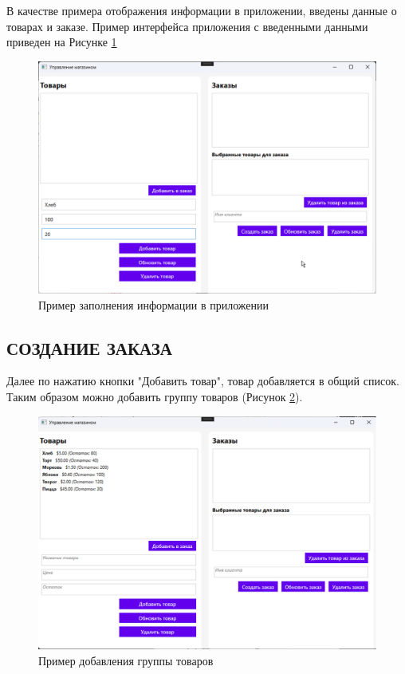 \documentclass[12pt]{article}
\begin{document}
В качестве примера отображения информации в приложении, введены данные о товарах и заказе. Пример интерфейса приложения с введенными данными приведен на Рисунке \ref{fig:demo2}

\begin{figure}[ht]
	\centering
	\includegraphics[width=1.0\textwidth]{fig/image 27.png}
	\caption{Пример заполнения информации в приложении}
	\label{fig:demo2}
\end{figure}

\pagebreak

\subsection{СОЗДАНИЕ ЗАКАЗА}

Далее по нажатию кнопки "Добавить товар", товар добавляется в общий список. Таким образом можно добавить группу товаров (Рисунок \ref{fig:demo3}).

\begin{figure}[ht]
	\centering
	\includegraphics[width=1.0\textwidth]{fig/image 60.png}
	\caption{Пример добавления группы товаров}
	\label{fig:demo3}
\end{figure}
\end{document}
